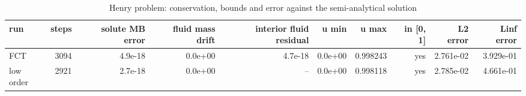 \begin{table}[h]
\centering
\caption{Henry problem: conservation, bounds and error against the semi-analytical solution}
\begin{tabular}{lrrrrrrrrr}
\hline
run & steps & solute MB error & fluid mass drift & interior fluid residual & u min & u max & in [0, 1] & L2 error & Linf error \\
\hline
FCT & 3094 & 4.9e-18 & 0.0e+00 & 4.7e-18 & 0.0e+00 & 0.998243 & yes & 2.761e-02 & 3.929e-01 \\
low order & 2921 & 2.7e-18 & 0.0e+00 & -- & 0.0e+00 & 0.998118 & yes & 2.785e-02 & 4.661e-01 \\
\hline
\end{tabular}
\end{table}
